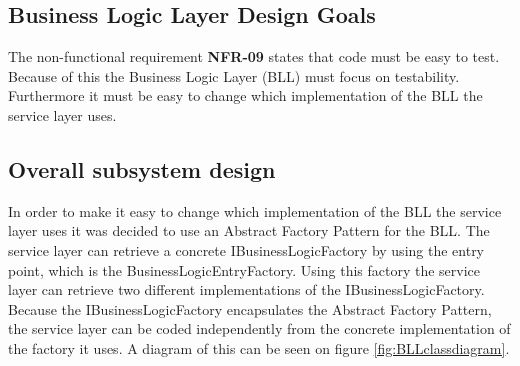 \documentclass[../report.tex]{subfiles}
\begin{document}
\graphicspath{{img/}{../img/}}

\subsection{Business Logic Layer Design Goals}
The non-functional requirement \textbf{NFR-09} states that code must be easy to test. 
Because of this the Business Logic Layer (BLL) must focus on testability.
Furthermore it must be easy to change which implementation of the BLL the service layer uses. 

\subsection{Overall subsystem design}
In order to make it easy to change which implementation of the BLL the service layer uses it was decided to use an Abstract Factory Pattern for the BLL.
The service layer can retrieve a concrete IBusinessLogicFactory by using the entry point, which is the BusinessLogicEntryFactory. 
Using this factory the service layer can retrieve two different implementations of the IBusinessLogicFactory. 
Because the IBusinessLogicFactory encapsulates the Abstract Factory Pattern, the service layer can be coded independently from the concrete implementation of the factory it uses.
A diagram of this can be seen on figure \ref{fig:BLLclassdiagram}.
\end{document}
